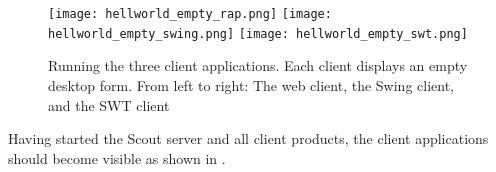 \begin{figure}
\texttt{[image: hellworld\_empty\_rap.png]} \hspace{3mm}
\texttt{[image: hellworld\_empty\_swing.png]} \hspace{3mm}
\texttt{[image: hellworld\_empty\_swt.png]}
\caption{Running the three client applications. 
Each client displays an empty desktop form. 
From left to right: The web client, the Swing client, and the SWT client}
\end{figure}

Having started the Scout server and all client products, the client applications should become visible as shown in .


